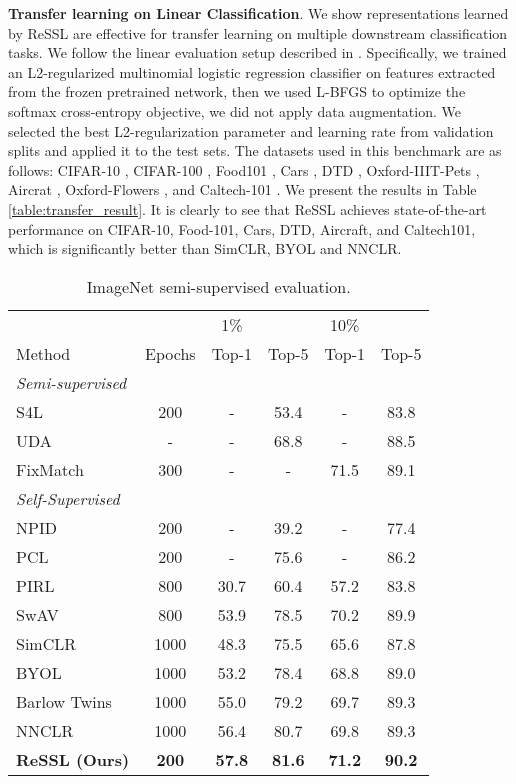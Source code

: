 \documentclass{article}
\newcommand{\<}{\left\langle}
\renewcommand{\>}{\right\rangle}
\begin{document}
\textbf{Transfer learning on Linear Classification}.  
We show representations learned by ReSSL are effective for transfer learning on multiple downstream classification tasks. We follow the linear evaluation setup described in \cite{simclr, byol}. Specifically, we trained an L2-regularized multinomial logistic regression classifier on features extracted from the frozen pretrained network, then we used L-BFGS \cite{lbfgs} to optimize the softmax cross-entropy objective, we did not apply data augmentation. We selected the best L2-regularization parameter and learning rate from validation splits and applied it to the test sets. The datasets used in this benchmark are as follows: CIFAR-10 \cite{cifar}, CIFAR-100 \cite{cifar}, Food101 \cite{food101}, Cars \cite{cars}, DTD \cite{dtd}, Oxford-IIIT-Pets \cite{pets}, Aircrat \cite{aircraft}, Oxford-Flowers \cite{flowers}, and Caltech-101 \cite{caltech101}. We present the results in Table \ref{table:transfer_result}. It is clearly to see that ReSSL achieves state-of-the-art performance on CIFAR-10, Food-101, Cars, DTD, Aircraft, and Caltech101, which is significantly better than SimCLR, BYOL and NNCLR.



\renewcommand\arraystretch{1.0}
\begin{table}[h]
 \centering
 \setlength\tabcolsep{5pt}
 \vspace{-5pt}
 \caption{ImageNet semi-supervised evaluation.}
 \vspace{-10pt}
 \label{table:semi}
\begin{tabular}{l  c  c c  c  c} 
\toprule 
 & & 1\% &  & 10\% &  \\
Method & Epochs & Top-1 & Top-5 & Top-1 & Top-5 \\
\hline
\emph{Semi-supervised} \\
S4L \cite{s4l} & 200 & - & 53.4 & - & 83.8 \\
UDA \cite{uda} & - & - & 68.8 & - & 88.5 \\
FixMatch \cite{fixmatch} & 300 & - & - & 71.5 & 89.1 \\
\hline
\emph{Self-Supervised} \\
NPID \cite{instance_discrimination} & 200 & - & 39.2 & - & 77.4 \\
PCL \cite{PCL} & 200 & - & 75.6 & - & 86.2 \\
PIRL \cite{pirl} & 800 & 30.7 & 60.4 & 57.2 & 83.8 \\
SwAV \cite{swav} & 800 & 53.9 & 78.5 & 70.2 & 89.9 \\ 
SimCLR \cite{simclr} & 1000 & 48.3 & 75.5 & 65.6 & 87.8 \\ 
BYOL \cite{byol} & 1000 & 53.2 & 78.4 & 68.8 & 89.0 \\ 
Barlow Twins \cite{barlowtwins} & 1000 & 55.0 & 79.2 & 69.7 & 89.3 \\
NNCLR \cite{nnclr} & 1000 & 56.4 & 80.7 & 69.8 & 89.3 \\
\textbf{ReSSL (Ours)} & \textbf{200} & \textbf{57.8} & \textbf{81.6} & \textbf{71.2} & \textbf{90.2} \\
\bottomrule
\end{tabular}
\end{table}
\end{document}
